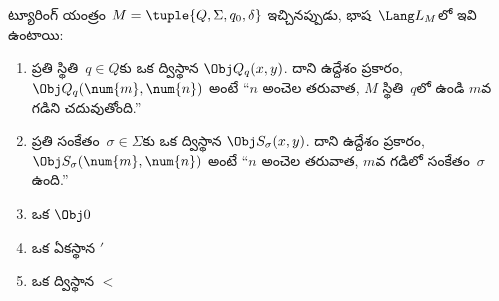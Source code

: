 \documentclass[../../../include/open-logic-section]{subfiles}
\begin{document}
\begin{defn}
ట్యూరింగ్ యంత్రం $M = \tuple{Q, \Sigma, q_0, \delta}$ ఇచ్చినప్పుడు,
భాష~$\Lang L_M$లో ఇవి ఉంటాయి:
\begin{enumerate}
\item ప్రతి స్థితి~$q \in Q$కు ఒక ద్విస్థాన 
  $\Obj Q_q(x, y)$. దాని ఉద్దేశం ప్రకారం, $\Obj Q_q(\num{m}, \num{n})$ అంటే
  ``$n$ అంచెల తరువాత, $M$ స్థితి~$q$లో ఉండి $m$వ గడిని చదువుతోంది.''
\item ప్రతి సంకేతం~$\sigma\in \Sigma$కు ఒక ద్విస్థాన 
  $\Obj S_\sigma(x, y)$. దాని ఉద్దేశం ప్రకారం,
  $\Obj S_\sigma(\num{m}, \num{n})$ అంటే ``$n$ అంచెల తరువాత, $m$వ గడిలో
  సంకేతం~$\sigma$ ఉంది.''
\item ఒక  $\Obj 0$
\item ఒక ఏకస్థాన  $\prime$
\item ఒక ద్విస్థాన  $<$
\end{enumerate}
\end{defn}
\end{document}
